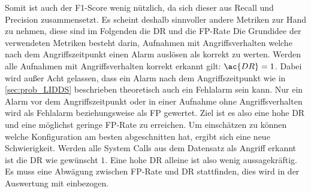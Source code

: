     Somit ist auch der F1-Score wenig nützlich, da sich dieser aus Recall und Precision zusammensetzt.
    Es scheint deshalb sinnvoller andere Metriken zur Hand zu nehmen, diese sind im Folgenden die \ac{DR} und die \ac{FP}-Rate
    Die Grundidee der verwendeten Metriken besteht darin, Aufnahmen mit Angriffsverhalten welche nach dem Angriffszeitpunkt einen Alarm auslösen als korrekt zu werten.
    Werden alle Aufnahmen mit Angriffsverhalten korrekt erkannt gilt: $\ac{DR}=1$.
    Dabei wird außer Acht gelassen, dass ein Alarm nach dem Angriffszeitpunkt wie in \autoref{sec:prob_LIDDS} beschrieben theoretisch auch ein Fehlalarm sein kann.
    Nur ein Alarm vor dem Angriffszeitpunkt oder in einer Aufnahme ohne Angriffsverhalten wird als Fehlalarm beziehungsweise als \ac{FP} gewertet.
    Ziel ist es also eine hohe \ac{DR} und eine möglichst geringe \ac{FP}-Rate zu erreichen.
    Um einschätzen zu können welche Konfiguration am besten abgeschnitten hat, ergibt sich eine neue Schwierigkeit.
    Werden alle System Calls aus dem Datensatz als Angriff erkannt ist die \ac{DR} wie gewünscht $1$.
    Eine hohe \ac{DR} alleine ist also wenig aussagekräftig.
    Es muss eine Abwägung zwischen \ac{FP}-Rate und \ac{DR} stattfinden, dies wird in der Auswertung mit einbezogen.
